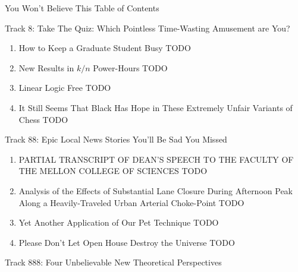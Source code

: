 \documentclass[letter]{article}
\newcommand\track[2]{{\Large Track #1: #2}}
\newcommand\paper[2]{\item \sf #1 \dotfill TODO}
\newcommand\keywords[1]{}
\begin{document}
\begin{center}
{\Huge You Won't Believe This Table of Contents}
\end{center}
\thispagestyle{empty}

\vspace{6em}


\track{8}{Take The Quiz: Which Pointless Time-Wasting Amusement are You?}

\begin{enumerate}
\paper{How to Keep a Graduate Student Busy}
{Paul Stansifer}
\keywords{all, work, and, no, play, makes, paul, a, dull, boy}
\paper{New Results in $k/n$ Power-Hours}
{Dr. Tom Murphy VII Ph.D.}
\keywords{generalized binge drinking, maths, finite-state automata, abstract interpretation}
\paper{Linear Logic Free}
{Carlo Angiuli}
\keywords{linear logic, free to play, app store}
\paper{It Still Seems That Black Has Hope in These Extremely Unfair Variants of Chess}
{Dr. Tom Murphy VII Ph.D., Ben Blum, and Jim McCann, in italics ...... oh! .... nervous laughter .... no, that's not part of the name still. I stopped saying the name. Why are you still typing? This isn't the name any more. End quote.}
\keywords{chess, stratego, guess who, clue, candy crush saga, game-tree search, combinations}
\end{enumerate}

\vspace{4em}

\track{88}{Epic Local News Stories You'll Be Sad You Missed}

\begin{enumerate}
\paper{PARTIAL TRANSCRIPT OF DEAN'S SPEECH TO THE FACULTY OF THE MELLON COLLEGE OF SCIENCES}
{Clint Falamenos}
\keywords{news, lane center, college of sciences}
\paper{Analysis of the Effects of Substantial Lane Closure During Afternoon Peak Along a Heavily-Traveled Urban Arterial Choke-Point}
{Nicholas Fudala}
\keywords{knowledge, pagers, RATPAG}
\paper{Yet Another Application of Our Pet Technique}
{Chester Francis and Nicholas Fudala}
\keywords{complexity, multiple patents pending, nobel peace prize}
\paper{Please Don't Let Open House Destroy the Universe}
{Jenn Landefeld}
\keywords{open house, destruction of universe, herding cats}
\end{enumerate}

\vspace{4em}

\track{888}{Four Unbelievable New Theoretical Perspectives}
\end{document}
